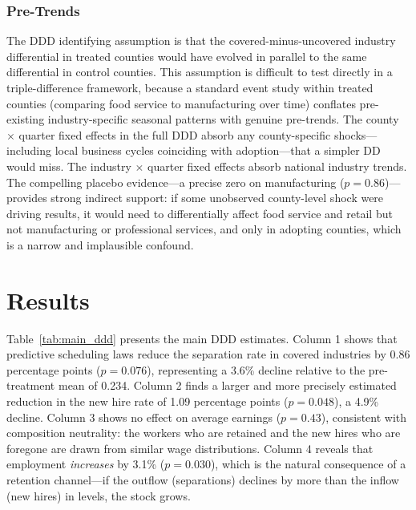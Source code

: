 \documentclass[12pt]{article}
\begin{document}
\subsubsection*{Pre-Trends} The DDD identifying assumption is that the covered-minus-uncovered industry differential in treated counties would have evolved in parallel to the same differential in control counties. This assumption is difficult to test directly in a triple-difference framework, because a standard event study within treated counties (comparing food service to manufacturing over time) conflates pre-existing industry-specific seasonal patterns with genuine pre-trends. The county $\times$ quarter fixed effects in the full DDD absorb any county-specific shocks---including local business cycles coinciding with adoption---that a simpler DD would miss. The industry $\times$ quarter fixed effects absorb national industry trends. The compelling placebo evidence---a precise zero on manufacturing ($p = 0.86$)---provides strong indirect support: if some unobserved county-level shock were driving results, it would need to differentially affect food service and retail but not manufacturing or professional services, and only in adopting counties, which is a narrow and implausible confound.

\section{Results}



Table~\ref{tab:main_ddd} presents the main DDD estimates. Column 1 shows that predictive scheduling laws reduce the separation rate in covered industries by 0.86 percentage points ($p = 0.076$), representing a 3.6\% decline relative to the pre-treatment mean of 0.234. Column 2 finds a larger and more precisely estimated reduction in the new hire rate of 1.09 percentage points ($p = 0.048$), a 4.9\% decline. Column 3 shows no effect on average earnings ($p = 0.43$), consistent with composition neutrality: the workers who are retained and the new hires who are foregone are drawn from similar wage distributions. Column 4 reveals that employment \emph{increases} by 3.1\% ($p = 0.030$), which is the natural consequence of a retention channel---if the outflow (separations) declines by more than the inflow (new hires) in levels, the stock grows.
\end{document}
